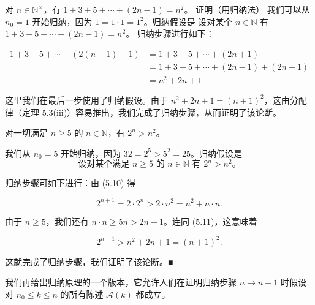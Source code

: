 \begin{example}

\begin{items}
\item

对 $ n \in \mathbb{N}^\times $，有 $ 1 + 3 + 5 + \cdots + (2n - 1) = n^2 $。
证明（用归纳法） 我们可以从 $ n_{0}=1 $ 开始归纳，因为 $ 1=1\cdot1=1^{2} $。归纳假设是
设对某个 $ n \in \mathbb{N} $ 有 $ 1 + 3 + 5 + \cdots + (2n - 1) = n^2 $。
归纳步骤进行如下：

\begin{equation*}
\begin{aligned}
1+3+5+\cdots+\left(2(n+1)-1\right)&=1+3+5+\cdots+(2n+1)\\&=1+3+5+\cdots+(2n-1)+(2n+1)\\&=n^{2}+2n+1.
\end{aligned}
\end{equation*}

这里我们在最后一步使用了归纳假设。由于 $ n^2 + 2n + 1 = (n + 1)^2 $，这由分配律（定理 5.3(iii)）容易推出，我们完成了归纳步骤，从而证明了该论断。

\item

对一切满足 $ n \geq 5 $ 的 $ n \in \mathbb{N} $，有 $ 2^n > n^2 $。

\proofhead
我们从 $ n_0 = 5 $ 开始归纳，因为 $ 32 = 2^5 > 5^2 = 25 $。归纳假设是
\begin{equation}
\text{设对某个满足 } n \geq 5 \text{ 的 } n \in \mathbb{N} \text{ 有 } 2^n > n^2\text{。}
\end{equation}

归纳步骤可如下进行：由 (5.10) 得

\begin{equation}
2^{n+1}=2\cdot2^{n}>2\cdot n^{2}=n^{2}+n\cdot n.
\end{equation}

由于 $ n \geq 5 $，我们还有 $ n \cdot n \geq 5n > 2n + 1 $。连同 (5.11)，这意味着

\[
2^{n+1}>n^{2}+2n+1=(n+1)^{2}.
\]

这就完成了归纳步骤，我们证明了该论断。■

\end{items}

我们再给出归纳原理的一个版本，它允许人们在证明归纳步骤 $ n \to n + 1 $ 时假设对 $ n_0 \leq k \leq n $ 的所有陈述 $ \mathcal{A}(k) $ 都成立。

\end{example}

